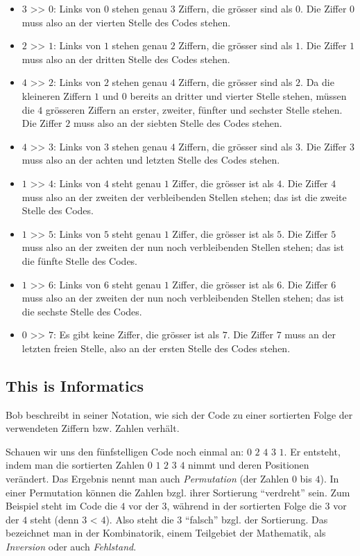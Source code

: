 \documentclass[a4paper,11pt]{report}
\begin{document}
\begin{itemize}
  \item $3$ >\textcompwordmark{}> $0$:  Links von $0$ stehen genau $3$ Ziffern, die grösser sind als $0$.
Die Ziffer $0$ muss also an der vierten Stelle des Codes stehen.
  \item $2$ >\textcompwordmark{}> $1$:  Links von $1$ stehen genau $2$ Ziffern, die grösser sind als $1$.
Die Ziffer $1$ muss also an der dritten Stelle des Codes stehen.
  \item $4$ >\textcompwordmark{}> $2$:  Links von $2$ stehen genau $4$ Ziffern, die grösser sind als $2$.
Da die kleineren Ziffern $1$ und $0$ bereits an dritter und vierter Stelle stehen,
müssen die $4$ grösseren Ziffern an erster, zweiter, fünfter und sechster Stelle stehen.
Die Ziffer $2$ muss also an der siebten Stelle des Codes stehen.
  \item $4$ >\textcompwordmark{}> $3$:  Links von $3$ stehen genau $4$ Ziffern, die grösser sind als $3$.
Die Ziffer $3$ muss also an der achten und letzten Stelle des Codes stehen.
  \item $1$ >\textcompwordmark{}> $4$:  Links von $4$ steht genau $1$ Ziffer, die grösser ist als $4$.
Die Ziffer $4$ muss also an der zweiten der verbleibenden Stellen stehen; das ist die zweite Stelle des Codes.
  \item $1$ >\textcompwordmark{}> $5$:  Links von $5$ steht genau $1$ Ziffer, die grösser ist als $5$.
Die Ziffer $5$ muss also an der zweiten der nun noch verbleibenden Stellen stehen; das ist die fünfte Stelle des Codes.
  \item $1$ >\textcompwordmark{}> $6$:  Links von $6$ steht genau $1$ Ziffer, die grösser ist als $6$.
Die Ziffer $6$ muss also an der zweiten der nun noch verbleibenden Stellen stehen; das ist die sechste Stelle des Codes.
  \item $0$ >\textcompwordmark{}> $7$:  Es gibt keine Ziffer, die grösser ist als $7$.
Die Ziffer $7$ muss an der letzten freien Stelle, also an der ersten Stelle des Codes stehen.
\end{itemize}


\subsection*{This is Informatics}

Bob beschreibt in seiner Notation, wie sich der Code zu einer sortierten Folge der verwendeten Ziffern bzw. Zahlen verhält.

Schauen wir uns den fünfstelligen Code noch einmal an:  $0$ $2$ $4$ $3$ $1$.
Er entsteht, indem man die sortierten Zahlen $0$ $1$ $2$ $3$ $4$ nimmt und deren Positionen verändert.  Das Ergebnis nennt man auch \emph{Permutation} (der Zahlen $0$ bis $4$).
In einer Permutation können die Zahlen bzgl. ihrer Sortierung \enquote{verdreht} sein.
Zum Beispiel steht im Code die $4$ vor der $3$, während in der sortierten Folge die $3$ vor der $4$ steht (denn $3$ < $4$).
Also steht die $3$ \enquote{falsch} bzgl. der Sortierung. Das bezeichnet man in der Kombinatorik, einem Teilgebiet der Mathematik, als \emph{Inversion} oder auch \emph{Fehlstand}.
\end{document}
